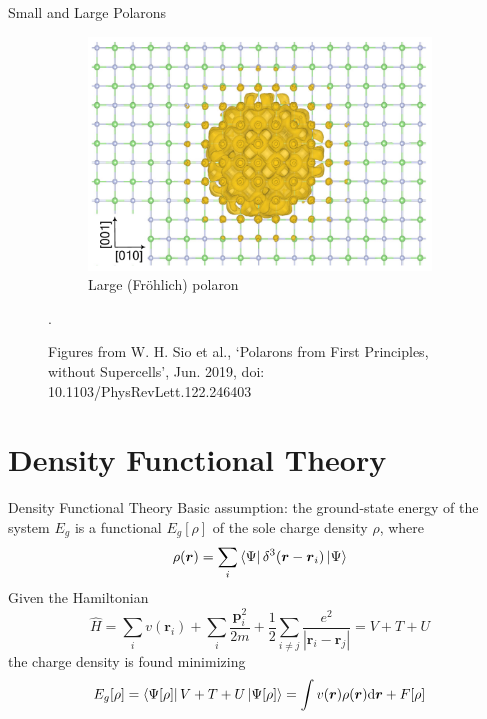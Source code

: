 \documentclass[11pt, xcolor=dvipsnames, aspectratio=43]{beamer}
\newcommand{\oper}[1]{\hat{#1}}
\renewcommand{\vec}[1]{\mathbf{\boldsymbol{#1}}}
\newcommand{\oh}{\frac{1}{2}}
\begin{document}
\begin{frame}{Small and Large Polarons}
\begin{figure}[p]
\begin{subfigure}[b]{0.49\textwidth}
            \includegraphics[width=\textwidth]{figures/large.png}
            \caption{Large (Fröhlich) polaron}
            \label{fig:large}
        \end{subfigure}
        \caption{Figures from W. H. Sio et al., ‘Polarons from First Principles, without Supercells’, Jun. 2019, doi: 10.1103/PhysRevLett.122.246403}.
        \label{fig:small_large}
    \end{figure}
\end{frame}

\section{Density Functional Theory}
\begin{frame}{Density Functional Theory}
    Basic assumption: the ground-state energy of the system $E_g$ is a \alert{functional $E_g[\rho]$ of the sole charge density $\rho$}, where
    \begin{equation*}
        \rho(\vec{r}) = \sum_i \bra{\Psi} \delta^3(\vec{r}-\vec{r}_i)\ket{\Psi}
    \end{equation*}
    \pause
    Given the Hamiltonian
    \begin{equation*} \label{eq:hamiltonian_DFT}
        \oper{H} = \sum_i v(\vec{r}_i) + \sum_i \frac{\vec{p}_i^2}{2m} + \oh \sum_{i\neq j} \frac{e^2}{|\vec{r}_i - \vec{r}_j|} = V + T + U
    \end{equation*}
    the charge density is found \alert{minimizing}
    \begin{equation*} \label{eq:ground_functional}
        E_g[\rho] = \bra{\Psi[\rho]} V+T+U \ket{\Psi[\rho]} = \int v(\vec{r}) \rho(\vec{r}) \differential \vec{r} + F[\rho]
    \end{equation*}
\end{frame}
\end{document}
